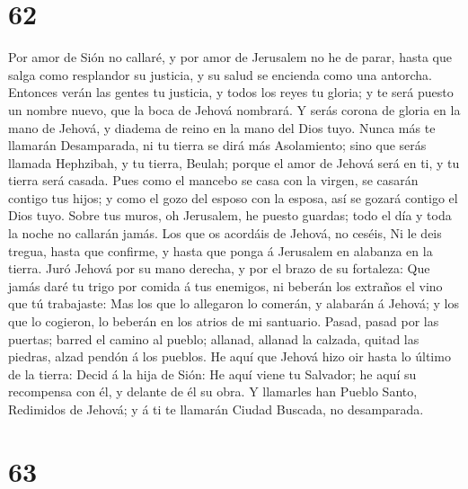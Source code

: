 \hypertarget{section-61}{%
\section{62}\label{section-61}}

 Por amor de Sión no callaré, y por amor de Jerusalem no he
de parar, hasta que salga como resplandor su justicia, y su salud se
encienda como una antorcha.  Entonces verán las gentes tu
justicia, y todos los reyes tu gloria; y te será puesto un nombre nuevo,
que la boca de Jehová nombrará.  Y serás corona de gloria en
la mano de Jehová, y diadema de reino en la mano del Dios tuyo.
 Nunca más te llamarán Desamparada, ni tu tierra se dirá más
Asolamiento; sino que serás llamada Hephzibah, y tu tierra, Beulah;
porque el amor de Jehová será en ti, y tu tierra será casada.
 Pues como el mancebo se casa con la virgen, se casarán
contigo tus hijos; y como el gozo del esposo con la esposa, así se
gozará contigo el Dios tuyo.  Sobre tus muros, oh Jerusalem,
he puesto guardas; todo el día y toda la noche no callarán jamás. Los
que os acordáis de Jehová, no ceséis,  Ni le deis tregua,
hasta que confirme, y hasta que ponga á Jerusalem en alabanza en la
tierra.  Juró Jehová por su mano derecha, y por el brazo de
su fortaleza: Que jamás daré tu trigo por comida á tus enemigos, ni
beberán los extraños el vino que tú trabajaste:  Mas los que
lo allegaron lo comerán, y alabarán á Jehová; y los que lo cogieron, lo
beberán en los atrios de mi santuario.  Pasad, pasad por
las puertas; barred el camino al pueblo; allanad, allanad la calzada,
quitad las piedras, alzad pendón á los pueblos.  He aquí
que Jehová hizo oir hasta lo último de la tierra: Decid á la hija de
Sión: He aquí viene tu Salvador; he aquí su recompensa con él, y delante
de él su obra.  Y llamarles han Pueblo Santo, Redimidos de
Jehová; y á ti te llamarán Ciudad Buscada, no desamparada.

\hypertarget{section-62}{%
\section{63}\label{section-62}}

